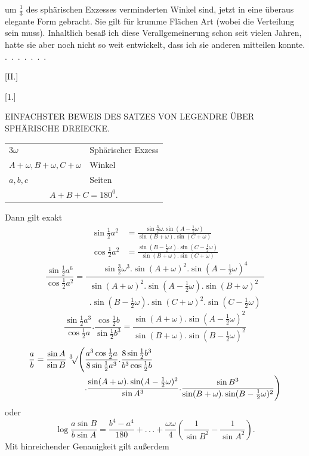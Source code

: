 %
um $\frac13$ des sphärischen Exzesses verminderten Winkel sind, jetzt in eine überaus elegante Form gebracht. Sie gilt für krumme Flächen  Art (wobei die Verteilung  sein muss). Inhaltlich besaß ich diese Verallgemeinerung schon seit vielen Jahren, hatte sie aber noch nicht so weit entwickelt, dass ich sie anderen mitteilen konnte. \mbox{. . . . . . .}
\par{}
\begin{center}[II.]\end{center}
\begin{center}[1.]\end{center}
\begin{center}EINFACHSTER BEWEIS DES SATZES VON LEGENDRE ÜBER SPHÄRISCHE DREIECKE.\end{center}
\begin{center}\begin{tabular}{ll}
$3\omega$ & Sphärischer Exzess\\
$A+\omega,B+\omega,C+\omega$ & Winkel\\
$a,b,c$ & Seiten\\
\multicolumn{2}{c}{$A+B+C=180^0.$}
\end{tabular}\end{center}
\noindent\hspace*{1.2em}Dann gilt exakt
\[
\begin{aligned}
\sin\tfrac12 a^2&=\frac{\sin\tfrac32\omega.\sin(A-\tfrac12\omega)}{\sin(B+\omega).\sin(C+\omega)}\\
\cos\tfrac12 a^2&=\frac{\sin(B-\tfrac12\omega).\sin(C-\tfrac12\omega)}{\sin(B+\omega).\sin(C+\omega)}
\end{aligned}
\]
\[
\frac{\sin\frac12 a^6}{\cos\frac12 a^2}=\frac{\sin\frac32\omega^3.\sin(A+\omega)^2.\sin(A-\frac12\omega)^4}{\begin{gathered}\sin(A+\omega)^2.\sin(A-\frac12\omega).\sin(B+\omega)^2\\.\sin(B-\frac12\omega).\sin(C+\omega)^2.\sin(C-\frac12\omega)\end{gathered}}
\]
\[
\frac{\sin\frac12 a^3}{\cos\frac12 a}.\frac{\cos\frac12 b}{\sin\frac12 b^3}=\frac{\sin(A+\omega).\sin(A-\frac12\omega)^2}{\sin(B+\omega).\sin(B-\frac12\omega)^2}
\]
\[
\begin{aligned}
\frac ab=\frac{\sin A}{\sin B}\mkern6mu{}^3\mkern-4mu\mathord{\surd}\Biggl(&\frac{a^3\cos\frac12 a}{8\sin\frac12 a^3}.\frac{8\sin\frac12 b^3}{b^3\cos\frac12 b}\\
&.\frac{\sin(A+\omega).\sin(A-\frac12\omega)^2}{\sin A^3}.\frac{\sin B^3}{\sin(B+\omega).\sin(B-\frac12\omega)^2}\Biggr)
\end{aligned}
\]
\noindent oder
\[
\log\frac{a\sin B}{b\sin A}=\frac{b^4-a^4}{180}+.\, .\, .+\frac{\omega\omega}{4}\left(\frac{1}{\sin B^2}-\frac{1}{\sin A^2}\right).
\]
\noindent Mit hinreichender Genauigkeit gilt außerdem
